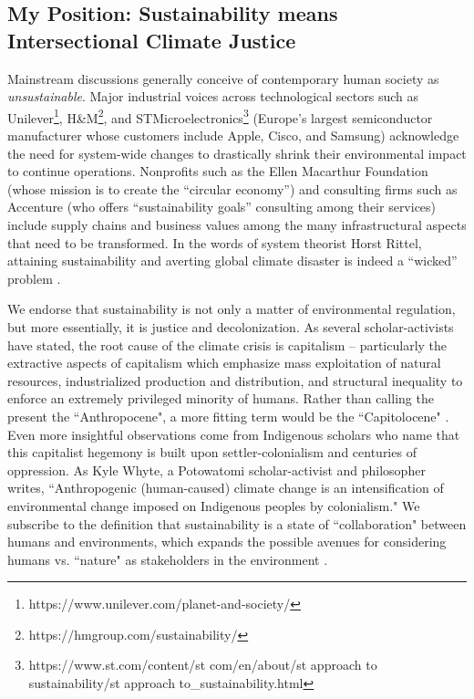 \subsection{My Position: Sustainability means Intersectional Climate Justice}

Mainstream discussions generally conceive of contemporary human society as \textit{unsustainable}. Major industrial voices across technological sectors such as Unilever\footnote{https://www.unilever.com/planet-and-society/}, H\&M\footnote{https://hmgroup.com/sustainability/}, and STMicroelectronics\footnote{https://www.st.com/content/st\textunderscore
com/en/about/st\textunderscore
approach\textunderscore
to\textunderscore
sustainability/st\textunderscore
approach\textunderscore
to\_sustainability.html} (Europe's largest semiconductor manufacturer whose customers include Apple, Cisco, and Samsung) acknowledge the need for system-wide changes to drastically shrink their environmental impact to continue operations. %
Nonprofits such as the Ellen Macarthur Foundation (whose mission is to create the ``circular economy'') and consulting firms such as Accenture (who offers ``sustainability goals'' consulting among their services) include supply chains and business values among the many infrastructural aspects that need to be transformed. In the words of system theorist Horst Rittel, attaining sustainability and averting global climate disaster is indeed a ``wicked'' problem \cite{rittel_dilemmas_1969}.

We endorse that sustainability is not only a matter of environmental regulation, but more essentially, it is justice and decolonization. As several scholar-activists have stated, the root cause of the climate crisis is capitalism -- particularly the extractive aspects of capitalism which emphasize mass exploitation of natural resources, industrialized production and distribution, and structural inequality to enforce an extremely privileged minority of humans. Rather than calling the present the ``Anthropocene", a more fitting term would be the ``Capitolocene" \cite{haraway_staying_2016, sze_environmental_2020}. Even more insightful observations come from Indigenous scholars who name that this capitalist hegemony is built upon settler-colonialism and centuries of oppression. As Kyle Whyte, a Potowatomi scholar-activist and philosopher writes, ``Anthropogenic (human-caused) climate change is an intensification of environmental change imposed on Indigenous peoples by colonialism." \cite{whyte_weaving_2016} We subscribe to the definition that sustainability is a state of ``collaboration" between humans and environments, which expands the possible avenues for considering  humans vs. ``nature" as stakeholders in the environment \cite{kimmerer_braiding_2015, tallbear_standing_2014}.

